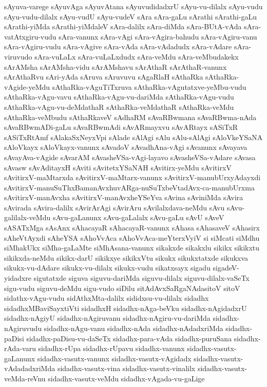 {sAyuva-varege
sAyuvAga
sAyuvAtana
sAyuvudidadxrU
sAyu-vu-dilalx
sAyu-vudu
sAyu-vudu-dilalx
sAyu-vudU
sAyu-vudeV
sAra
sAra-gaLu
sArathi
sArathi-gaLu
sArathi-yiMda
sArathi-yiMdaleV
sAra-dalilx
sAra-diMda
sAra-BUtA-vAda
sAra-vatAtxgiru-vudu
sAra-vanunx
sAra-vAgi
sAra-vAgira-bahudu
sAra-vAgiru-vanu
sAra-vAgiru-vudu
sAra-vAgive
sAra-vAda
sAra-vAdadudx
sAra-vAdare
sAra-viruvudo
sAra-vuLaLx
sAra-vuLaLxdudx
sAra-veMdu
sAra-veMbudakekx
sArAMsha
sArAMsha-vidu
sArAMshavu
sArAthaR
sArAthaR-vanunx
sArAthaRvu
sAri-yAda
sAruva
sAruvuvu
sAgaRlaH
sAthaRka
sAthaRka-vAgide-yeMdu
sAthaRka-vAguTiTxruva
sAthaRka-vAgutatxve-yeMbu-vudu
sAthaRka-vAgu-vavu
sAthaRka-vAgu-vu-dariMda
sAthaRka-vAgu-vudu
sAthaRka-vAgu-vu-deMdathaR
sAthaRka-veMdathaR
sAthaRka-veMdu
sAthaRka-veMbudu
sAthaRkaveV
sAdhaRM
sAvaRBwmana
sAvaRBwma-nAda
sAvaRBwmADi-gaLu
sAvaRBwmAdi
sAvARmayxvu
sAvARtayx
sASiTxR
sASiTxRtAmf
sAlakaSxNeyxVpi
sAlade
sAlAgi
sAlu
sAlu-sAlAgi
sAloVkeYSaNA
sAloVkayx
sAloVkayx-vanunx
sAvadoV
sAvadhAna-vAgi
sAvanunx
sAvayava
sAvayAva-vAgide
sAvarAM
sAvasheVSa-vAgi-layavo
sAvasheVSa-vAdare
sAvasa
sAvasw
sAvAditayxH
sAviti
sAvitetxYSaNAH
sAvitirx-yeMdu
sAvitirxV
sAvitirxV-maMtarxda
sAvitirxV-maMtarx-vanunx
sAvitirxV-manubUrxyAdayxdi
sAvitirxV-manuSuThxBamanAvxhuvARga-nuSuTxbeVtadAvx-ca-manubUrxma
sAvitirxV-manAvxha
sAvitirxV-manAvxheYSeYva
sAvina
sAviniMda
sAvira
sAvirada
sAvira-dalilx
sAvirArAgi
sAvirAru
sAvilalxdava-neMdu
sAvu
sAvu-galilalx-veMdu
sAvu-gaLanunx
sAvu-gaLalalx
sAvu-gaLu
sAvU
sAveV
sASATxMga
sAsAnx
sAhacayaR
sAhacayaR-vanunx
sAhasa
sAhasaveV
sAhasirx
sAheVtAyxdi
sAheYSA
sAhoVvAca
sAhoVvAca-meYterxVyiV
si
siMcati
siMdhu
siMhakUkx
siMha-gaLaMte
siMhAsana-vanunx
sikakxde
sikakxlu
sikikx
sikikxtu
sikikxda-neMdu
sikikx-darU
sikikxye
sikikxVtu
sikukx
sikukxtatxde
sikukxva
sikukx-vu-dAdare
sikukx-vu-dilalx
sikukx-vudu
sikatxsayx
sigadu
sigadeV-yidadxre
sigutatxde
siguva
siguvu-dariMda
siguvu-dilalx
siguvu-dilalx-vaSeTx
sigu-vudu
siguvu-deMdu
sigu-vudo
siDilu
sitAdAvxSaRgaNAdasitoV
sitoV
sidathx-vAgu-vudu
sidAthxMta-dalilx
sididxsu-vu-dilalx
sidadhx
sidadhxMBaviSayxtiVti
sidadhxH
sidadhx-nAga-beVku
sidadhx-nAgidadxrU
sidadhx-nAgiyU
sidadhx-nAgiruvanu
sidadhx-nAgiru-vu-dariMda
sidadhx-nAgiruvudu
sidadhx-nAgu-vanu
sidadhx-nAda
sidadhx-nAdadxriMda
sidadhx-paDisi
sidadhx-paDisu-vu-daSeTx
sidadhx-para-vAda
sidadhx-puruSana
sidadhx-rAda-varu
sidadhx-rUpa
sidadhx-rUpavu
sidadhx-vanunx
sidadhx-vasutx-gaLanunx
sidadhx-vasutx-vanunx
sidadhx-vasutx-vAgidadx
sidadhx-vasutx-vAdadadxriMda
sidadhx-vasutx-vina
sidadhx-vasutx-vinalilx
sidadhx-vasutx-veMda-reVnu
sidadhx-vasutx-veMdu
sidadhx-vAgada-vu-gaLige
}
